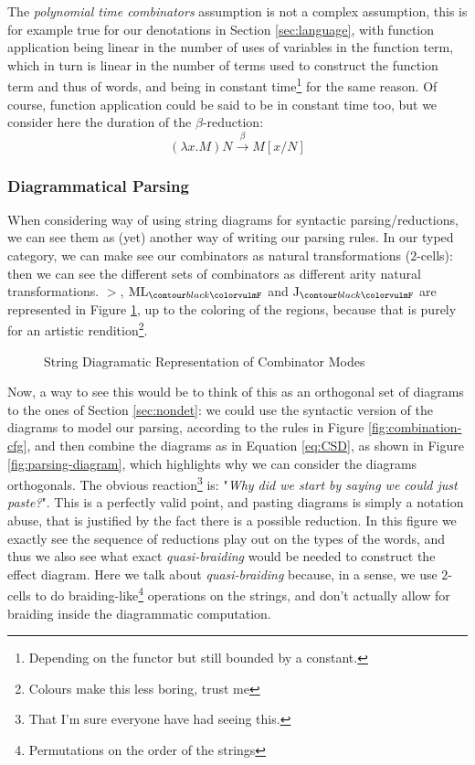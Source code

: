 The \emph{polynomial time combinators} assumption is not a complex assumption,
this is for example true for our denotations in Section \ref{sec:language},
with function application being linear in the number of uses of variables in
the function term, which in turn is linear in the number of terms used to
construct the function term and thus of words, and \fmap being in constant
time\footnote{Depending on the functor but still bounded by a constant.} for
the same reason.
Of course, function application could be said to be in constant time too, but
we consider here the duration of the $\beta$-reduction:
\begin{equation*}
	\left(\lambda x. M\right)N \xrightarrow{\beta} M\left[x / N\right]
\end{equation*}

\subsubsection{Diagrammatical Parsing}
\label{subsubsec:diagram-parsing}
When considering 
way of using string diagrams for syntactic parsing/reductions, we can see them
as (yet) another way of writing our parsing rules.
In our typed category, we can make see our combinators as natural
transformations ($2$-cells): then we can see the different sets of combinators
as different arity natural transformations.
$>$, $\combML_{\f{F}}$ and $\combJ_{\f{F}}$ are represented in
Figure \ref{fig:combinator-sd}, up to the coloring of the regions, because that
is purely for an artistic rendition\footnote{Colours make this less boring,
	trust me}.

\begin{figure}
	\centering
	
	\caption{String Diagramatic Representation of Combinator Modes}
	\label{fig:combinator-sd}
\end{figure}

Now, a way to see this would be to think of this as an orthogonal set of
diagrams to the ones of Section \ref{sec:nondet}: we could use the syntactic
version of the diagrams to model our parsing, according to the rules in
Figure \ref{fig:combination-cfg}, and then combine the diagrams as in Equation
\ref{eq:CSD}, as shown in Figure \ref{fig:parsing-diagram}, which highlights
why we can consider the diagrams orthogonals.
The obvious reaction\footnote{That I'm sure everyone have had seeing this.} is:
"\emph{Why did we start by saying we could just paste?}".
This is a perfectly valid point, and pasting diagrams is simply a notation
abuse, that is justified by the fact there is a possible reduction.
In this figure we exactly see the sequence of reductions play out on the types
of the words, and thus we also see what exact \emph{quasi-braiding} would be
needed to construct the effect diagram.
Here we talk about \emph{quasi-braiding} because, in a sense, we use $2$-cells
to do braiding-like\footnote{Permutations on the order of the strings}
operations on the strings, and don't actually allow for braiding inside the
diagrammatic computation.


